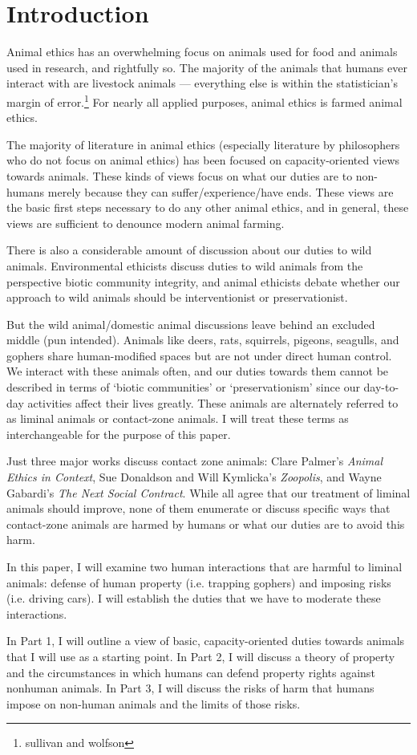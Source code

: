 \chapter*{Introduction}

Animal ethics has an overwhelming focus on animals used for food and animals
used in research, and rightfully so. The majority of the animals that humans
ever interact with are livestock animals --- everything else is within the
statistician’s margin of error.\footnote{sullivan and wolfson} For nearly all
applied purposes, animal ethics is farmed animal ethics.

The majority of literature in animal ethics (especially literature by
philosophers who do not focus on animal ethics) has been focused on
capacity-oriented views towards animals. These kinds of views focus on what our
duties are to non-humans merely because they can suffer/experience/have ends.
These views are the basic first steps necessary to do any other animal ethics,
and in general, these views are sufficient to denounce modern animal farming.

There is also a considerable amount of discussion about our duties to wild
animals. Environmental ethicists discuss duties to wild animals from the
perspective biotic community integrity, and animal ethicists debate whether our
approach to wild animals should be interventionist or preservationist.

But the wild animal/domestic animal discussions leave behind an excluded middle
(pun intended). Animals like deers, rats, squirrels, pigeons, seagulls, and
gophers share human-modified spaces but are not under direct human control. We
interact with these animals often, and our duties towards them cannot be
described in terms of ‘biotic communities’ or ‘preservationism’ since our
day-to-day activities affect their lives greatly. These animals are alternately
referred to as liminal animals or contact-zone animals. I will
treat these terms as interchangeable for the purpose of this paper.

Just three major works discuss contact zone animals: Clare Palmer’s
\emph{Animal Ethics in Context}, Sue Donaldson and Will Kymlicka’s
\emph{Zoopolis}, and Wayne Gabardi’s \emph{The Next Social Contract}.  While
all agree that our treatment of liminal animals should improve, none of them
enumerate or discuss specific ways that contact-zone animals are harmed by
humans or what our duties are to avoid this harm.

In this paper, I will examine two human interactions that are harmful to
liminal animals: defense of human property (i.e. trapping gophers) and imposing
risks (i.e. driving cars). I will establish the duties that we have to moderate
these interactions.

In Part 1, I will outline a view of basic, capacity-oriented duties towards
animals that I will use as a starting point. In Part 2, I will discuss a theory
of property and the circumstances in which humans can defend property rights
against nonhuman animals. In Part 3, I will discuss the risks of harm that
humans impose on non-human animals and the limits of those risks.

